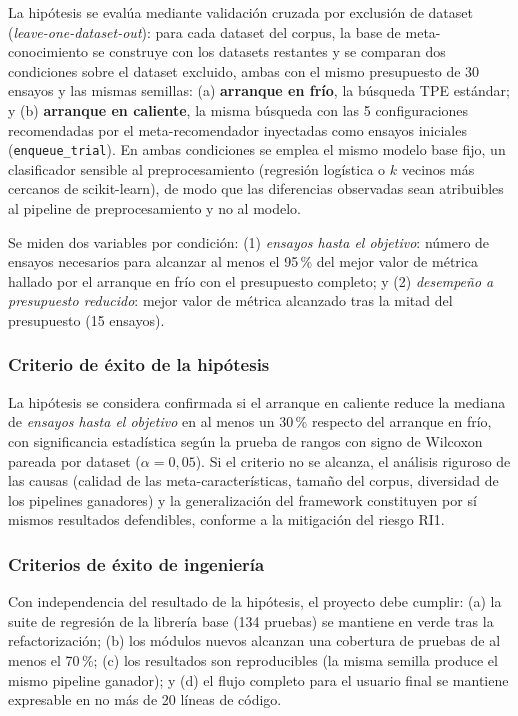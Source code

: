 \documentclass[12pt,letterpaper]{article}
\begin{document}
La hipótesis se evalúa mediante validación cruzada por exclusión de dataset (\textit{leave-one-dataset-out}): para cada dataset del corpus, la base de meta-conocimiento se construye con los datasets restantes y se comparan dos condiciones sobre el dataset excluido, ambas con el mismo presupuesto de 30 ensayos y las mismas semillas: (a) \textbf{arranque en frío}, la búsqueda TPE estándar; y (b) \textbf{arranque en caliente}, la misma búsqueda con las 5 configuraciones recomendadas por el meta-recomendador inyectadas como ensayos iniciales (\texttt{enqueue\_trial}). En ambas condiciones se emplea el mismo modelo base fijo, un clasificador sensible al preprocesamiento (regresión logística o $k$ vecinos más cercanos de scikit-learn), de modo que las diferencias observadas sean atribuibles al pipeline de preprocesamiento y no al modelo.

Se miden dos variables por condición: (1) \textit{ensayos hasta el objetivo}: número de ensayos necesarios para alcanzar al menos el 95\,\% del mejor valor de métrica hallado por el arranque en frío con el presupuesto completo; y (2) \textit{desempeño a presupuesto reducido}: mejor valor de métrica alcanzado tras la mitad del presupuesto (15 ensayos).

\subsubsection{Criterio de éxito de la hipótesis}

La hipótesis se considera confirmada si el arranque en caliente reduce la mediana de \textit{ensayos hasta el objetivo} en al menos un 30\,\% respecto del arranque en frío, con significancia estadística según la prueba de rangos con signo de Wilcoxon pareada por dataset ($\alpha = 0{,}05$). Si el criterio no se alcanza, el análisis riguroso de las causas (calidad de las meta-características, tamaño del corpus, diversidad de los pipelines ganadores) y la generalización del framework constituyen por sí mismos resultados defendibles, conforme a la mitigación del riesgo RI1.

\subsubsection{Criterios de éxito de ingeniería}

Con independencia del resultado de la hipótesis, el proyecto debe cumplir: (a) la suite de regresión de la librería base (134 pruebas) se mantiene en verde tras la refactorización; (b) los módulos nuevos alcanzan una cobertura de pruebas de al menos el 70\,\%; (c) los resultados son reproducibles (la misma semilla produce el mismo pipeline ganador); y (d) el flujo completo para el usuario final se mantiene expresable en no más de 20 líneas de código.
\end{document}
